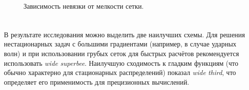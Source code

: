 \documentclass[a4paper,10pt]{article}
\begin{document}
\begin{figure}[h]
	\caption{Зависимость невязки от мелкости сетки.}\label{fig:residual}
\end{figure}

\section*{}
В результате исследования можно выделить две наилучших схемы.
Для решения нестационарных задач с большими градиентами (например, в случае ударных волн)
и при использовании грубых сеток для быстрых расчётов рекомендуется использовать \textit{wide superbee}.
Наилучшую сходимость к гладким функциям (что обычно характерно для стационарных распределений) показал \textit{wide third},
что определяет его применимость для прецизионных вычислений.

\centering{}

\end{document}
